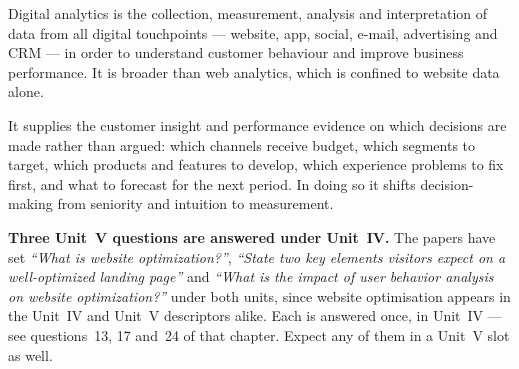 \begin{qlist}
Digital analytics is the collection, measurement, analysis and interpretation
of data from all digital touchpoints --- website, app, social, e-mail,
advertising and CRM --- in order to understand customer behaviour and improve
business performance. It is broader than web analytics, which is confined to
website data alone.

It supplies the customer insight and performance evidence on which decisions
are made rather than argued: which channels receive budget, which segments to
target, which products and features to develop, which experience problems to
fix first, and what to forecast for the next period. In doing so it shifts
decision-making from seniority and intuition to measurement.

\begin{tcolorbox}[colback=tint,colframe=ocre,boxrule=0.8pt,sharp corners,
  fontupper=\small, breakable]
\textbf{\sffamily Three Unit~V questions are answered under Unit~IV.} The
papers have set \emph{``What is website optimization?''}, \emph{``State two key
elements visitors expect on a well-optimized landing page''} and \emph{``What is
the impact of user behavior analysis on website optimization?''} under both
units, since website optimisation appears in the Unit~IV and Unit~V descriptors
alike. Each is answered once, in Unit~IV --- see questions~13, 17 and~24 of that
chapter. Expect any of them in a Unit~V slot as well.
\end{tcolorbox}

\end{qlist}

\partb

